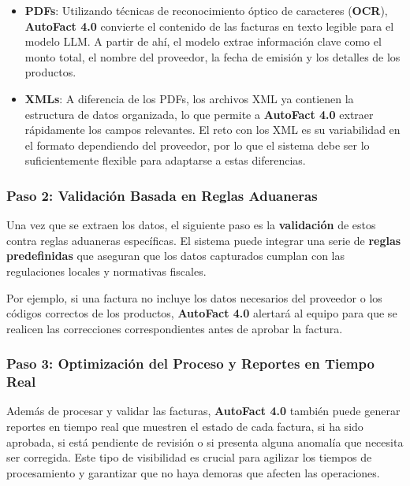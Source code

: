 \documentclass[
  10pt,
  letterpaper,
]{book}
\begin{document}
\begin{itemize}
\item
  \textbf{PDFs}: Utilizando técnicas de reconocimiento óptico de
  caracteres (\textbf{OCR}), \textbf{AutoFact 4.0} convierte el
  contenido de las facturas en texto legible para el modelo LLM. A
  partir de ahí, el modelo extrae información clave como el monto total,
  el nombre del proveedor, la fecha de emisión y los detalles de los
  productos.
\item
  \textbf{XMLs}: A diferencia de los PDFs, los archivos XML ya contienen
  la estructura de datos organizada, lo que permite a \textbf{AutoFact
  4.0} extraer rápidamente los campos relevantes. El reto con los XML es
  su variabilidad en el formato dependiendo del proveedor, por lo que el
  sistema debe ser lo suficientemente flexible para adaptarse a estas
  diferencias.
\end{itemize}

\subsubsection{\texorpdfstring{\textbf{Paso 2: Validación Basada en
Reglas
Aduaneras}}{Paso 2: Validación Basada en Reglas Aduaneras}}\label{paso-2-validaciuxf3n-basada-en-reglas-aduaneras}

Una vez que se extraen los datos, el siguiente paso es la
\textbf{validación} de estos contra reglas aduaneras específicas. El
sistema puede integrar una serie de \textbf{reglas predefinidas} que
aseguran que los datos capturados cumplan con las regulaciones locales y
normativas fiscales.

Por ejemplo, si una factura no incluye los datos necesarios del
proveedor o los códigos correctos de los productos, \textbf{AutoFact
4.0} alertará al equipo para que se realicen las correcciones
correspondientes antes de aprobar la factura.

\subsubsection{\texorpdfstring{\textbf{Paso 3: Optimización del Proceso
y Reportes en Tiempo
Real}}{Paso 3: Optimización del Proceso y Reportes en Tiempo Real}}\label{paso-3-optimizaciuxf3n-del-proceso-y-reportes-en-tiempo-real}

Además de procesar y validar las facturas, \textbf{AutoFact 4.0} también
puede generar reportes en tiempo real que muestren el estado de cada
factura, si ha sido aprobada, si está pendiente de revisión o si
presenta alguna anomalía que necesita ser corregida. Este tipo de
visibilidad es crucial para agilizar los tiempos de procesamiento y
garantizar que no haya demoras que afecten las operaciones.
\end{document}
